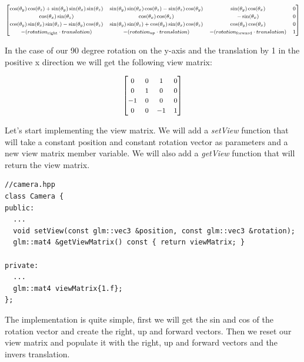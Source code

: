 \documentclass[12pt]{report} \usepackage{preamble}
\begin{document}
\[
	\fontsize{8}{12}\selectfont
	\begin{bmatrix}
		\cos(\theta_y) \cos(\theta_z) + \sin(\theta_y) \sin(\theta_x) \sin(\theta_z) & \sin(\theta_y) \sin(\theta_x) \cos(\theta_z) - \sin(\theta_z) \cos(\theta_y) & \sin(\theta_y) \cos(\theta_x)                  & 0 \\
		\cos(\theta_x) \sin(\theta_z)                                                & \cos(\theta_x) \cos(\theta_z)                                                & -\sin(\theta_x)                                & 0 \\
		\cos(\theta_y) \sin(\theta_x) \sin(\theta_z) - \sin(\theta_y) \cos(\theta_z) & \sin(\theta_y) \sin(\theta_z) + \cos(\theta_y) \sin(\theta_x) \cos(\theta_z) & \cos(\theta_y) \cos(\theta_x)                  & 0 \\
		-(rotation_{\text{right}} \cdot translation)                                 & -(rotation_{\text{up}} \cdot translation)                                    & -(rotation_{\text{forward}} \cdot translation) & 1 \\
	\end{bmatrix}
\]

In the case of our 90 degree rotation on the y-axis and the translation by 1 in the positive x direction we will get the following view matrix:

\[
	\fontsize{8}{12}\selectfont
	\begin{bmatrix}
		0  & 0 & 1  & 0 \\
		0  & 1 & 0  & 0 \\
		-1 & 0 & 0  & 0 \\
		0  & 0 & -1 & 1 \\
	\end{bmatrix}
\]

Let's start implementing the view matrix. We will add a \textit{setView} function that will take a constant position and constant rotation vector as parameters
and a new view matrix member variable. We will also add a \textit{getView} function that will return the view matrix.

\begin{lstlisting}[Language=C++]
//camera.hpp
class Camera {
public:
  ...
  void setView(const glm::vec3 &position, const glm::vec3 &rotation);
  glm::mat4 &getViewMatrix() const { return viewMatrix; }

private:
  ...
  glm::mat4 viewMatrix{1.f};
};
\end{lstlisting}

The implementation is quite simple, first we will get the sin and cos of the rotation vector and create the right, up and forward vectors.
Then we reset our view matrix and populate it with the right, up and forward vectors and the invers translation.
\end{document}
